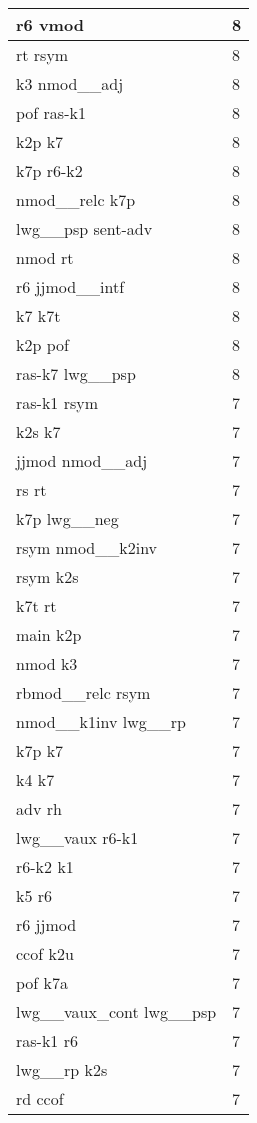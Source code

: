 \documentclass[a4 paper]{article}
\begin{document}
\begin{longtable}{p{}p{}}
r6 vmod  & 8 \\ \midrule
rt rsym  & 8 \\ \midrule
k3 nmod\_\_adj  & 8 \\ \midrule
pof ras-k1  & 8 \\ \midrule
k2p k7  & 8 \\ \midrule
k7p r6-k2  & 8 \\ \midrule
nmod\_\_relc k7p  & 8 \\ \midrule
lwg\_\_psp sent-adv  & 8 \\ \midrule
nmod rt  & 8 \\ \midrule
r6 jjmod\_\_intf  & 8 \\ \midrule
k7 k7t  & 8 \\ \midrule
k2p pof  & 8 \\ \midrule
ras-k7 lwg\_\_psp  & 8 \\ \midrule
ras-k1 rsym  & 7 \\ \midrule
k2s k7  & 7 \\ \midrule
jjmod nmod\_\_adj  & 7 \\ \midrule
rs rt  & 7 \\ \midrule
k7p lwg\_\_neg  & 7 \\ \midrule
rsym nmod\_\_k2inv  & 7 \\ \midrule
rsym k2s  & 7 \\ \midrule
k7t rt  & 7 \\ \midrule
main k2p  & 7 \\ \midrule
nmod k3  & 7 \\ \midrule
rbmod\_\_relc rsym  & 7 \\ \midrule
nmod\_\_k1inv lwg\_\_rp  & 7 \\ \midrule
k7p k7  & 7 \\ \midrule
k4 k7  & 7 \\ \midrule
adv rh  & 7 \\ \midrule
lwg\_\_vaux r6-k1  & 7 \\ \midrule
r6-k2 k1  & 7 \\ \midrule
k5 r6  & 7 \\ \midrule
r6 jjmod  & 7 \\ \midrule
ccof k2u  & 7 \\ \midrule
pof k7a  & 7 \\ \midrule
lwg\_\_vaux\_cont lwg\_\_psp  & 7 \\ \midrule
ras-k1 r6  & 7 \\ \midrule
lwg\_\_rp k2s  & 7 \\ \midrule
rd ccof  & 7 \\ \midrule

\end{longtable}
\end{document}
